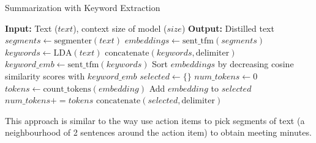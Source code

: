 		\begin{algorithm}
			\caption{Summarization with Keyword Extraction}
			\begin{algorithmic}
				\State \textbf{Input:} Text ($text$), context size of model ($size$)
				\State \textbf{Output:} Distilled text
				\State $segments \leftarrow \text{segmenter}(text)$
				\State $embeddings \leftarrow \text{sent\_tfm}(segments)$
				\State $keywords \leftarrow \text{LDA}(text)$
				\State $\text{concatenate}(keywords, \text{delimiter})$
				\State $keyword\_emb \leftarrow \text{sent\_tfm}(keywords)$
				\State Sort $embeddings$ by decreasing cosine similarity scores with $keyword\_emb$
				\State $selected \leftarrow \{\}$
				\State $num\_tokens \leftarrow 0$
					\State $tokens \leftarrow \text{count\_tokens}(embedding)$
						\State Add $embedding$ to $selected$
						\State $num\_tokens += tokens$
					\EndIf
				\EndFor
				\State $\text{concatenate}(selected, \text{delimiter})$
				\State {}
			\end{algorithmic}
		\end{algorithm}

		This approach is similar to the way \citet{golia2024action} use action items to pick segments
		of text (a neighbourhood of 2 sentences around the action item) to obtain meeting minutes.
